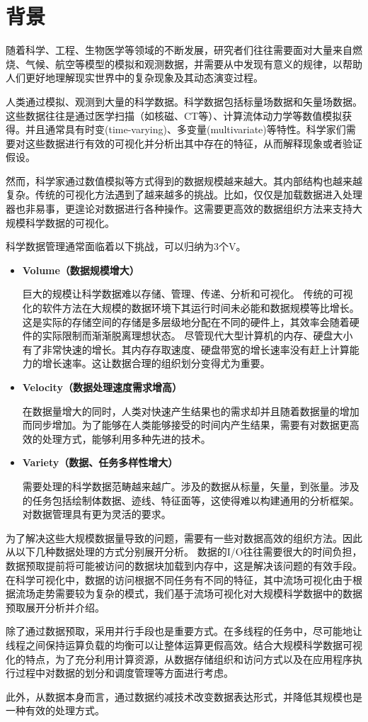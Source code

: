 \section{背景}
随着科学、工程、生物医学等领域的不断发展，研究者们往往需要面对大量来自燃烧、气候、航空等模型的模拟和观测数据，并需要从中发现有意义的规律，以帮助人们更好地理解现实世界中的复杂现象及其动态演变过程。

人类通过模拟、观测到大量的科学数据。科学数据包括标量场数据和矢量场数据。这些数据往往是通过医学扫描（如核磁、CT等）、计算流体动力学等数值模拟获得。并且通常具有时变(time-varying)、多变量(multivariate)等特性。科学家们需要对这些数据进行有效的可视化并分析出其中存在的特征，从而解释现象或者验证假设。

然而，科学家通过数值模拟等方式得到的数据规模越来越大。其内部结构也越来越复杂。传统的可视化方法遇到了越来越多的挑战。比如，仅仅是加载数据进入处理器也非易事，更遑论对数据进行各种操作。这需要更高效的数据组织方法来支持大规模科学数据的可视化。

科学数据管理通常面临着以下挑战，可以归纳为3个V。

\begin{itemize}

\item \textbf{Volume（数据规模增大）}

巨大的规模让科学数据难以存储、管理、传递、分析和可视化。
传统的可视化的软件方法在大规模的数据环境下其运行时间未必能和数据规模等比增长。
这是实际的存储空间的存储是多层级地分配在不同的硬件上，其效率会随着硬件的实际限制而渐渐脱离理想状态。
尽管现代大型计算机的内存、硬盘大小有了非常快速的增长。其内存存取速度、硬盘带宽的增长速率没有赶上计算能力的增长速率。这让数据合理的组织划分变得尤为重要。

\item \textbf{Velocity（数据处理速度需求增高）}

在数据量增大的同时，人类对快速产生结果也的需求却并且随着数据量的增加而同步增加。为了能够在人类能够接受的时间内产生结果，需要有对数据更高效的处理方式，能够利用多种先进的技术。

\item \textbf{Variety（数据、任务多样性增大）}

需要处理的科学数据范畴越来越广。涉及的数据从标量，矢量，到张量。涉及的任务包括绘制体数据、迹线、特征面等，这使得难以构建通用的分析框架。对数据管理具有更为灵活的要求。

\end{itemize}

为了解决这些大规模数据量导致的问题，需要有一些对数据高效的组织方法。因此从以下几种数据处理的方式分别展开分析。
数据的I/O往往需要很大的时间负担，数据预取提前将可能被访问的数据块加载到内存中，这是解决该问题的有效手段。在科学可视化中，数据的访问根据不同任务有不同的特征，其中流场可视化由于根据流场走势需要较为复杂的模式，我们基于流场可视化对大规模科学数据中的数据预取展开分析并介绍。

除了通过数据预取，采用并行手段也是重要方式。在多线程的任务中，尽可能地让线程之间保持运算负载的均衡可以让整体运算更假高效。结合大规模科学数据可视化的特点，为了充分利用计算资源，从数据存储组织和访问方式以及在应用程序执行过程中对数据的划分和调度管理等方面进行考虑。

此外，从数据本身而言，通过数据约减技术改变数据表达形式，并降低其规模也是一种有效的处理方式。




